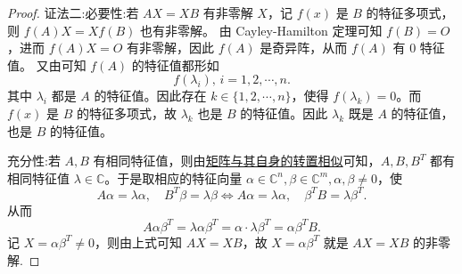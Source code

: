 \documentclass[../../main.tex]{subfiles}
\begin{document}
\begin{proof}
{\color{blue} 证法二:}{\heiti 必要性:}若 \( AX = XB \) 有非零解 \( X \)，记 \( f(x) \) 是 \( B \) 的特征多项式，则 \( f(A)X = Xf(B) \) 也有非零解。  
由 Cayley-Hamilton 定理可知 \( f(B) = O \)，进而 \( f(A)X = O \) 有非零解，因此 \( f(A) \) 是奇异阵，从而 \( f(A) \) 有 \( 0 \) 特征值。  
又由可知 \( f(A) \) 的特征值都形如  
\[ f(\lambda_i), \, i = 1,2,\cdots,n. \]  
其中 \( \lambda_i \) 都是 \( A \) 的特征值。因此存在 \( k \in \{1,2,\cdots,n\} \)，使得 \( f(\lambda_k) = 0 \)。而 \( f(x) \) 是 \( B \) 的特征多项式，故 \( \lambda_k \) 也是 \( B \) 的特征值。因此 \( \lambda_k \) 既是 \( A \) 的特征值，也是 \( B \) 的特征值。  

{\heiti 充分性:}若 \( A,B \) 有相同特征值，则由\hyperref[proposition:lambda-矩阵一定与其转置相似]{矩阵与其自身的转置相似}可知，\( A,B,B^T \) 都有相同特征值 \( \lambda \in \mathbb{C} \)。于是取相应的特征向量 \( \alpha \in \mathbb{C}^n, \beta \in \mathbb{C}^m, \alpha,\beta \ne 0 \)，使  
\[ A\alpha = \lambda \alpha, \quad B^T\beta = \lambda \beta \Longleftrightarrow A\alpha = \lambda \alpha, \quad \beta^TB = \lambda \beta^T. \]  
从而  
\[ A\alpha\beta^T = \lambda \alpha\beta^T = \alpha \cdot \lambda \beta^T = \alpha\beta^TB. \]  
记 \( X = \alpha\beta^T \ne 0 \)，则由上式可知 \( AX = XB \)，故 \( X = \alpha\beta^T \) 就是 \( AX = XB \) 的非零解. 

\end{proof}
\end{document}
